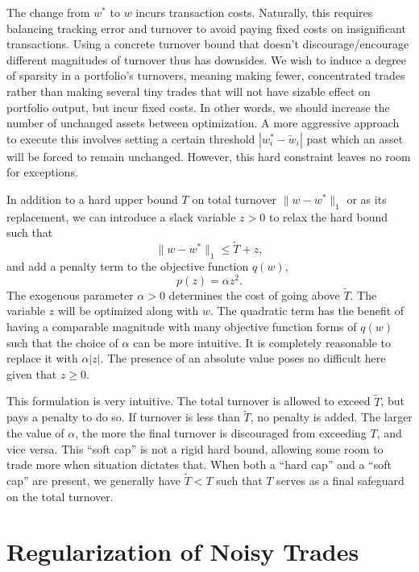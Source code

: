 \documentclass[11pt, letterpaper]{article}
\begin{document}
The change from $w^*$ to $w$ incurs transaction costs. Naturally, this requires balancing tracking error and turnover to avoid
paying fixed costs on insignificant transactions. Using a concrete turnover bound that doesn't discourage/encourage different
magnitudes of turnover thus has downsides. We wish to induce a degree of sparsity in a portfolio's turnovers, meaning making
fewer, concentrated trades rather than making several tiny trades that will not have sizable effect on portfolio output, but
incur fixed costs. In other words, we should increase the number of unchanged assets between optimization. A more aggressive
approach to execute this involves setting a certain threshold $\left |w^*_i - \tilde{w}_i \right|$ past which an asset will be
forced to remain unchanged. However, this hard constraint leaves no room for exceptions.

In addition to a hard upper bound $T$ on total turnover $\lVert w - w^*\rVert_1$ or as its replacement, we can introduce a slack
variable $z > 0$ to relax the hard bound such that
\begin{equation*}
	\lVert w - w^*\rVert_1 \leq \tilde{T} + z,
\end{equation*}
and add a penalty term to the objective function $q(w)$,
\begin{equation*}
	p(z) = \alpha z^2.
\end{equation*}
The exogenous parameter $\alpha > 0$ determines the cost of going above $\tilde{T}$. The variable $z$ will be optimized along
with $w$. The quadratic term has the benefit of having a comparable magnitude with many objective function forms of $q(w)$ such
that the choice of $\alpha$ can be more intuitive. It is completely reasonable to replace it with $\alpha |z|$. The presence of
an absolute value poses no difficult here given that $z \geq 0$.

This formulation is very intuitive. The total turnover is allowed to exceed $\tilde{T}$, but pays a penalty to do so. If
turnover is less than $\tilde{T}$, no penalty is added. The larger the value of $\alpha$, the more the final turnover is
discouraged from exceeding $T$, and vice versa. This ``soft cap'' is not a rigid hard bound, allowing some room to trade more
when situation dictates that. When both a ``hard cap'' and a ``soft cap'' are present, we generally have $\tilde{T} < T$ such
that $T$ serves as a final safeguard on the total turnover.

\section{Regularization of Noisy Trades}
\end{document}
